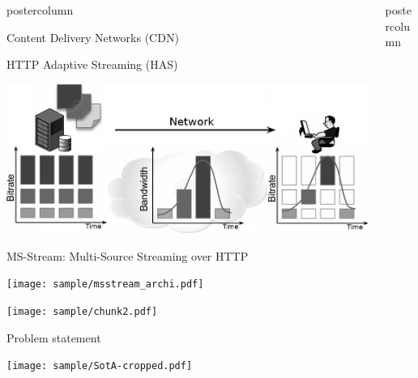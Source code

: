 \begin{frame}
\begin{columns}
\begin{column}{.49\textwidth}
\begin{beamercolorbox}[center,wd=\textwidth]{postercolumn}
\begin{minipage}[T]{.95\textwidth}
{\begin{block}{Content Delivery Networks (CDN)}
            \end{block}
            
            \vfill
            
            \begin{block}{HTTP Adaptive Streaming (HAS)}
            
            \centering
            
            \includegraphics[width=.925\textwidth]{sample/DASH-2.png}
            
            \end{block}
            
            \vfill
            
            \begin{block}{MS-Stream: Multi-Source Streaming over HTTP}
            
            \centering
            
            \texttt{[image: sample/msstream\_archi.pdf]}
            
            \texttt{[image: sample/chunk2.pdf]}
            
            \end{block}
            
            \vfill
            
            \begin{block}{Problem statement}
            
            \centering
            
            \texttt{[image: sample/SotA-cropped.pdf]}
            
            \end{block}
            
          }
        \end{minipage}
      \end{beamercolorbox}
    \end{column}
    \begin{column}{.49\textwidth}
      \begin{beamercolorbox}[center,wd=\textwidth]{postercolumn}
        \begin{minipage}[T]{.95\textwidth}
          \parbox[t][\columnheight]{\textwidth}{
            
}
\end{minipage}
\end{beamercolorbox}
\end{column}
\end{columns}
\end{frame}

